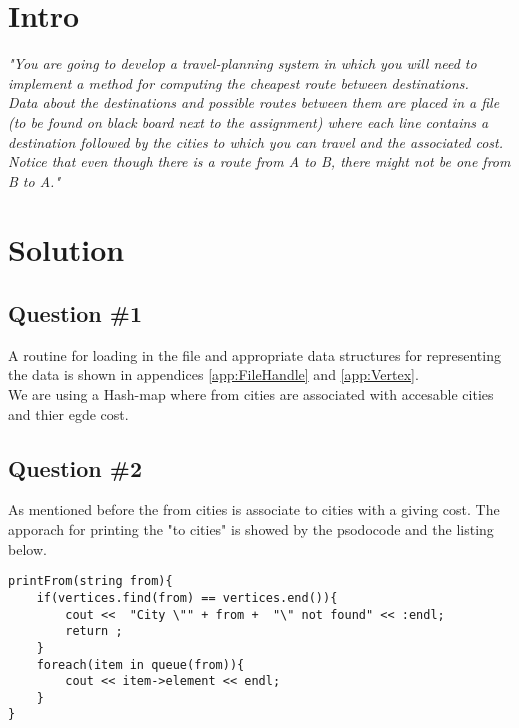\section{Intro}
\label{sec:intro}
\textit{"You are going to develop a travel-planning system in which you will need to implement a method for computing the cheapest route between destinations. \\
Data about the destinations and possible routes between them are placed in a file (to be found on black board next to the assignment) where each line contains a destination followed by the cities to which you can travel and the associated cost. \\
Notice that even though there is a route from A to B, there might not be one from B to A."}


\section{Solution}
\subsection{Question \#1}
A routine for loading in the file and appropriate data structures for representing the data is shown in appendices \ref{app:FileHandle} and \ref{app:Vertex}.\\
We are using a Hash-map where from cities are associated with accesable cities and thier egde cost.

\subsection{Question \#2}
As mentioned before the from cities is associate to cities with a giving cost.  The apporach for printing the "to cities" is showed by the psodocode and the listing below. 

\begin{lstlisting}
printFrom(string from){
	if(vertices.find(from) == vertices.end()){
		cout <<  "City \"" + from +  "\" not found" << :endl;
		return ;
	}
	foreach(item in queue(from)){
		cout << item->element << endl;
	}	
} 
\end{lstlisting}
\bigskip

